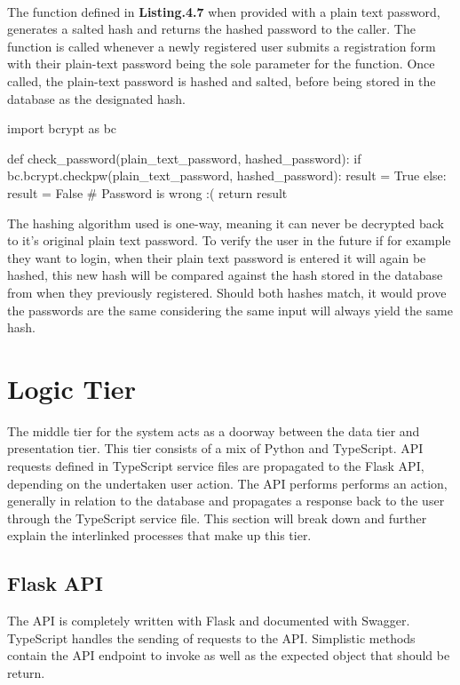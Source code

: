 \paragraph{}
The function defined in \textbf{Listing.4.7} when provided with a plain text password, generates a salted hash and returns the hashed password to the caller. The function is called whenever a newly registered user submits a registration form with their plain-text password being the sole parameter for the function. Once called, the plain-text password is hashed and salted, before being stored in the database as the designated hash. \newline

\begin{python}[caption=Verifing a Password]
import bcrypt as bc

def check_password(plain_text_password, hashed_password):
    if bc.bcrypt.checkpw(plain_text_password, hashed_password):
        result = True
    else:
        result = False # Password is wrong :(
    return result
\end{python}

The hashing algorithm used is one-way, meaning it can never be decrypted back to it's original plain text password. To verify the user in the future if for example they want to login, when their plain text password is entered it will again be hashed, this new hash will be compared against the hash stored in the database from when they previously registered. Should both hashes match, it would prove the passwords are the same considering the same input will always yield the same hash.

\section{Logic Tier}
The middle tier for the system acts as a doorway between the data tier and presentation tier. This tier consists of a mix of Python and TypeScript. API requests defined in TypeScript service files are propagated to the Flask API, depending on the undertaken user action. The API performs performs an action, generally in relation to the database and propagates a response back to the user through the TypeScript service file. This section will break down and further explain the interlinked processes that make up this tier.

\subsection{Flask API}
The API is completely written with Flask and documented with Swagger. TypeScript handles the sending of requests to the API. Simplistic methods contain the API endpoint to invoke as well as the expected object that should be return.

